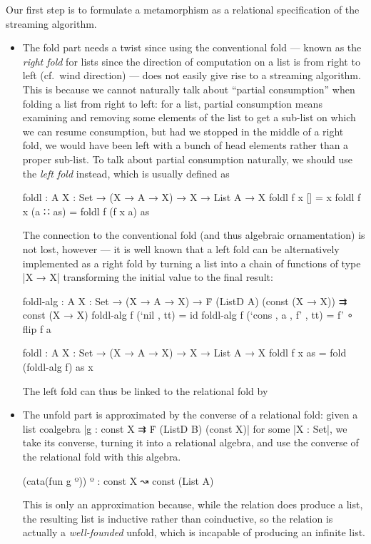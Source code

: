 Our first step is to formulate a metamorphism as a relational specification of the streaming algorithm.
\begin{itemize}
\item The fold part needs a twist since using the conventional fold --- known as the \emph{right fold} for lists since the direction of computation on a list is from right to left (cf.~wind direction) --- does not easily give rise to a streaming algorithm.
This is because we cannot naturally talk about ``partial consumption'' when folding a list from right to left: for a list, partial consumption means examining and removing some elements of the list to get a sub-list on which we can resume consumption, but had we stopped in the middle of a right fold, we would have been left with a bunch of head elements rather than a proper sub-list.
To talk about partial consumption naturally, we should use the \emph{left fold} instead, which is usually defined as
\begin{code}
foldl : {A X : Set} → (X → A → X) → X → List A → X
foldl f x []        = x
foldl f x (a ∷ as)  = foldl f (f x a) as
\end{code}
The connection to the conventional fold (and thus algebraic ornamentation) is not lost, however --- it is well known that a left fold can be alternatively implemented as a right fold by turning a list into a chain of functions of type |X → X| transforming the initial value to the final result:
\begin{code}
foldl-alg :  {A X : Set} → (X → A → X) →
             Ḟ (ListD A) (const (X → X)) ⇉ const (X → X)
foldl-alg f (`nil   ,           tt) = id
foldl-alg f (`cons  , a , f' ,  tt) = f' ∘ flip f a

foldl : {A X : Set} → (X → A → X) → X → List A → X
foldl f x as = fold (foldl-alg f) as x
\end{code}
The left fold can thus be linked to the relational fold by
\item The unfold part is approximated by the converse of a relational fold: given a list coalgebra |g : const X ⇉ Ḟ (ListD B) (const X)| for some |X : Set|, we take its converse, turning it into a relational algebra, and use the converse of the relational fold with this algebra.
\begin{code}
(cata(fun g º)) º : const X ↝ const (List A)
\end{code}
This is only an approximation because, while the relation does produce a list, the resulting list is inductive rather than coinductive, so the relation is actually a \emph{well-founded} unfold, which is incapable of producing an infinite list.
\end{itemize}
